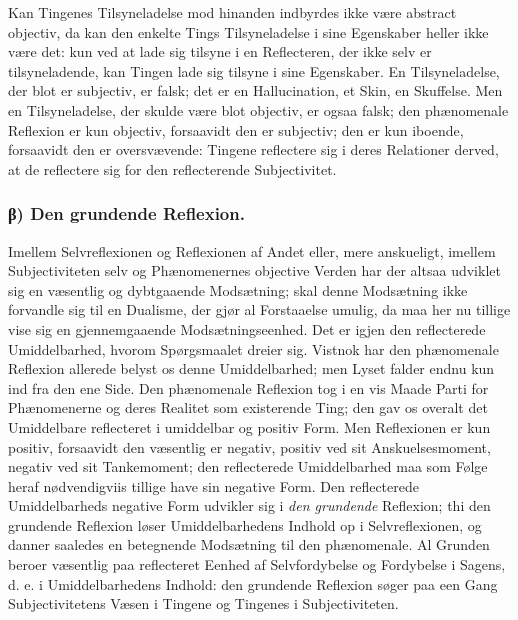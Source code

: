 \documentclass[11pt]{book}
\newcommand{\opage}[1]{\marginnote{\footnotesize\textit{[#1]}}}
\begin{document}
Kan Tingenes Tilsyneladelse mod hinanden indbyrdes ikke
være abstract objectiv, da kan den enkelte Tings Tilsyneladelse
i sine Egenskaber heller ikke være det: kun ved at lade sig
tilsyne i en Reflecteren, der ikke selv er tilsyneladende, kan
Tingen lade sig tilsyne i sine Egenskaber. En Tilsyneladelse,
der blot er subjectiv, er falsk; det er en Hallucination, et
Skin, en Skuffelse. Men en Tilsyneladelse, der skulde
\opage{85} \setcounter{footnote}{0}%
være blot objectiv, er ogsaa falsk; den phænomenale Reflexion
er kun objectiv, forsaavidt den er subjectiv; den er kun
iboende, forsaavidt den er oversvævende: Tingene reflectere sig
i deres Relationer derved, at de reflectere sig for den
reflecterende Subjectivitet.

\subsubsection*{β) Den grundende Reflexion.}

Imellem Selvreflexionen og Reflexionen af Andet eller, mere
anskueligt, imellem Subjectiviteten selv og Phænomenernes
objective Verden har der altsaa udviklet sig en væsentlig og
dybtgaaende Modsætning; skal denne Modsætning ikke
forvandle sig til en Dualisme, der gjør al Forstaaelse umulig,
da maa her nu tillige vise sig en gjennemgaaende
Modsætningseenhed. Det er igjen den reflecterede
Umiddelbarhed, hvorom Spørgsmaalet dreier sig. Vistnok har
den phænomenale Reflexion allerede belyst os denne
Umiddelbarhed; men Lyset falder endnu kun ind fra den ene
Side. Den phænomenale Reflexion tog i en vis Maade Parti
for Phænomenerne og deres Realitet som existerende Ting; den
gav os overalt det Umiddelbare reflecteret i umiddelbar og
positiv Form. Men Reflexionen er kun positiv, forsaavidt den
væsentlig er negativ, positiv ved sit Anskuelsesmoment, negativ
ved sit Tankemoment; den reflecterede Umiddelbarhed maa som
Følge heraf nødvendigviis tillige have sin negative Form. Den
reflecterede Umiddelbarheds negative Form udvikler sig i
\emph{den grundende} Reflexion; thi den grundende Reflexion
løser Umiddelbarhedens Indhold op i Selvreflexionen, og danner
saaledes en betegnende Modsætning til den phænomenale. Al
Grunden beroer væsentlig paa reflecteret Eenhed af
Selvfordybelse og Fordybelse i Sagens, d. e. i
Umiddelbarhedens Indhold: den grundende Reflexion søger paa
een Gang Subjectivitetens Væsen i Tingene og Tingenes i
Subjectiviteten.
\end{document}
